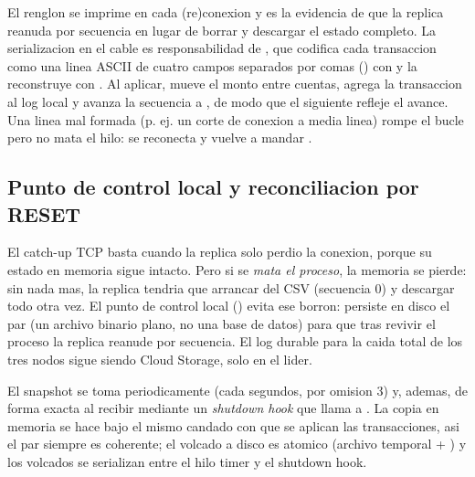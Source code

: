 El renglon  se imprime en
cada (re)conexion y es la evidencia de que la replica reanuda por secuencia en
lugar de borrar y descargar el estado completo. La serializacion en el cable es
responsabilidad de , que
codifica cada transaccion como una linea ASCII de cuatro campos separados por comas
() con  y la
reconstruye con . Al aplicar,  mueve el
monto entre cuentas, agrega la transaccion al log local y avanza la secuencia a
, de modo que el siguiente  refleje el avance. Una
linea mal formada (p. ej. un corte de conexion a media linea) rompe el bucle pero
no mata el hilo: se reconecta y vuelve a mandar .

\subsection{Punto de control local y reconciliacion por RESET}

El catch-up TCP basta cuando la replica solo perdio la conexion, porque su estado
en memoria sigue intacto. Pero si se \emph{mata el proceso}, la memoria se pierde:
sin nada mas, la replica tendria que arrancar del CSV (secuencia 0) y descargar
todo otra vez. El punto de control local
() evita ese borron:
persiste en disco el par  (un archivo binario plano,
no una base de datos) para que tras revivir el proceso la replica reanude por
secuencia. El log durable para la caida total de los tres nodos sigue siendo Cloud
Storage, solo en el lider.

El snapshot se toma periodicamente (cada  segundos,
por omision 3) y, ademas, de forma exacta al recibir  mediante un
\emph{shutdown hook} que llama a . La copia en memoria se hace
bajo el mismo candado con que se aplican las transacciones, asi el par
 siempre es coherente; el volcado a disco es atomico
(archivo temporal + ) y los volcados se serializan entre el hilo
timer y el shutdown hook.

